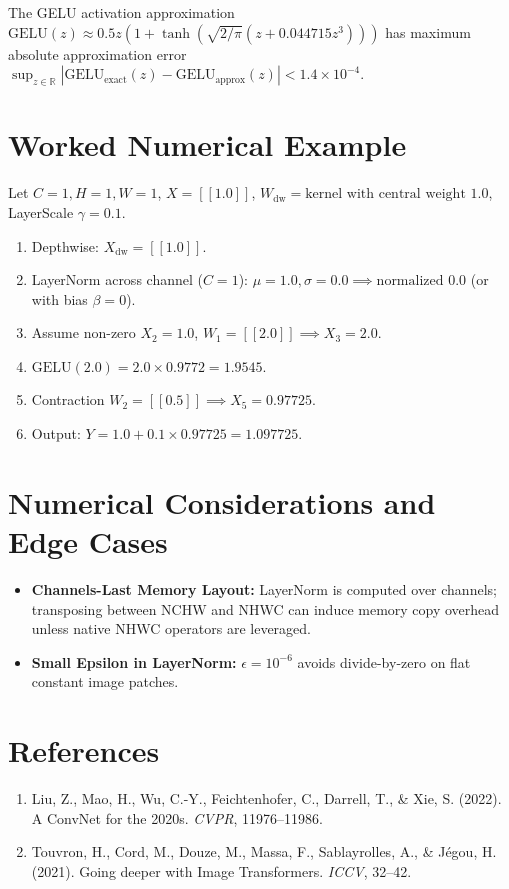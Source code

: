 \documentclass[11pt,a4paper]{article}
\theoremstyle{definition}
\begin{document}
The GELU activation approximation $\text{GELU}(z) \approx 0.5z(1 + \tanh(\sqrt{2/\pi}(z + 0.044715 z^3)))$ has maximum absolute approximation error $\sup_{z \in \mathbb{R}} |\text{GELU}_{\text{exact}}(z) - \text{GELU}_{\text{approx}}(z)| < 1.4 \times 10^{-4}$.

\section{Worked Numerical Example}

Let $C=1, H=1, W=1$, $X = [[1.0]]$, $W_{\text{dw}} = \text{kernel with central weight } 1.0$, LayerScale $\gamma = 0.1$.
\begin{enumerate}
    \item Depthwise: $X_{\text{dw}} = [[1.0]]$.
    \item LayerNorm across channel ($C=1$): $\mu = 1.0, \sigma = 0.0 \implies \text{normalized } 0.0$ (or with bias $\beta=0$).
    \item Assume non-zero $X_2 = 1.0$, $W_1 = [[2.0]] \implies X_3 = 2.0$.
    \item $\text{GELU}(2.0) = 2.0 \times 0.9772 = 1.9545$.
    \item Contraction $W_2 = [[0.5]] \implies X_5 = 0.97725$.
    \item Output: $Y = 1.0 + 0.1 \times 0.97725 = 1.097725$.
\end{enumerate}

\section{Numerical Considerations and Edge Cases}

\begin{itemize}
    \item \textbf{Channels-Last Memory Layout:} LayerNorm is computed over channels; transposing between NCHW and NHWC can induce memory copy overhead unless native NHWC operators are leveraged.
    \item \textbf{Small Epsilon in LayerNorm:} $\epsilon = 10^{-6}$ avoids divide-by-zero on flat constant image patches.
\end{itemize}

\section{References}
\begin{enumerate}
    \item Liu, Z., Mao, H., Wu, C.-Y., Feichtenhofer, C., Darrell, T., & Xie, S. (2022). A ConvNet for the 2020s. \emph{CVPR}, 11976--11986.
    \item Touvron, H., Cord, M., Douze, M., Massa, F., Sablayrolles, A., & J{\'e}gou, H. (2021). Going deeper with Image Transformers. \emph{ICCV}, 32--42.
\end{enumerate}
\end{document}
